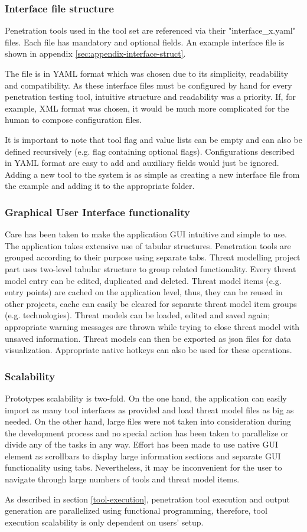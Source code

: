 	
	\subsubsection{Interface file structure}
	Penetration tools used in the tool set are referenced via their "interface\_x.yaml" files. Each file has mandatory and optional fields. An example interface file is shown in appendix \ref{sec:appendix-interface-struct}.
	
	The file is in YAML format which was chosen due to its simplicity, readability and compatibility. As these interface files must be configured by hand for every penetration testing tool, intuitive structure and readability was a priority. If, for example, XML format was chosen, it would be much more complicated for the human to compose configuration files.
	
	It is important to note that tool flag and value lists can be empty and can also be defined recursively (e.g. flag containing optional flags). Configurations described in YAML format are easy to add and auxiliary fields would just be ignored.
	Adding a new tool to the system is as simple as creating a new interface file from the example and adding it to the appropriate folder.
	
	
	\subsubsection{Graphical User Interface functionality}
	Care has been taken to make the application GUI intuitive and simple to use. 
	The application takes extensive use of tabular structures. Penetration tools are grouped according to their purpose using separate tabs. Threat modelling project part uses two-level tabular structure to group related functionality. 
	Every threat model entry can be edited, duplicated and deleted. 
	Threat model items (e.g. entry points) are cached on the application level, thus, they can be reused in other projects, cache can easily be cleared for separate threat model item groups (e.g. technologies).
	Threat models can be loaded, edited and saved again; appropriate warning messages are thrown while trying to close threat model with unsaved information. Threat models can then be exported as json files for data visualization. Appropriate native hotkeys can also be used for these operations.
	
	
	\subsubsection{Scalability}
	Prototypes scalability is two-fold. On the one hand, the application can easily import as many tool interfaces as provided and load threat model files as big as needed. On the other hand, large files were not taken into consideration during the development process and no special action has been taken to parallelize or divide any of the tasks in any way. Effort has been made to use native GUI element as scrollbars to display large information sections and separate GUI functionality using tabs. Nevertheless, it may be inconvenient for the user to navigate through large numbers of tools and threat model items.
	
	As described in section \ref{tool-execution}, penetration tool execution and output generation are parallelized using functional programming, therefore, tool execution scalability is only dependent on users’ setup.
	

